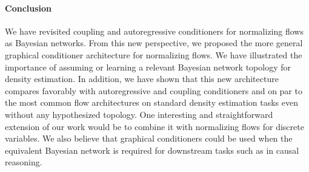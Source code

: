 
\paragraph{Conclusion}
We have revisited coupling and autoregressive conditioners for normalizing flows as Bayesian networks.
From this new perspective, we proposed the more general graphical conditioner architecture for normalizing flows. We have illustrated the importance of assuming or learning a relevant Bayesian network topology for density estimation. In addition, we have shown that this new architecture compares favorably with autoregressive and coupling conditioners and on par to the most common flow architectures on standard density estimation tasks even without any hypothesized topology. One interesting and straightforward extension of our work would be to combine it with normalizing flows for discrete variables.
We also believe that graphical conditioners could be used when the equivalent Bayesian network is required for downstream tasks such as in causal reasoning.
